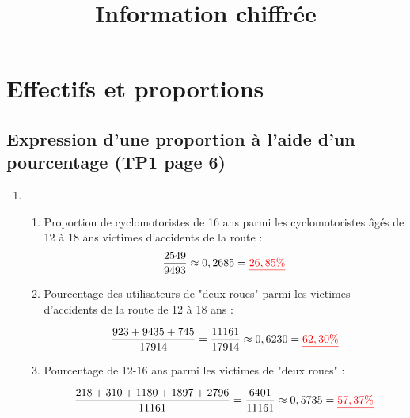 \documentclass[12pt,a4paper]{article}
\date{}
\title{Information chiffrée }
\begin{document}





\section{Effectifs et proportions}

\subsection{Expression d'une proportion à l'aide d'un pourcentage (TP1 page 6)}

\begin{enumerate}[label=\arabic*.]
	\item 
	\begin{enumerate} [label=\alph*) ]
		\item Proportion de cyclomotoristes de 16 ans parmi les cyclomotoristes âgés de 12 à 18 ans victimes d'accidents de la route :
			\begin{eqnarray*}
				\dfrac{2549}{9493} \approx 0,2685 = \textcolor{red}{\underline{26,85\%}}
			\end{eqnarray*}
			
		\item Pourcentage des utilisateurs de "deux roues" parmi les victimes d'accidents de la route de 12 à 18 ans :
		
			\begin{equation*}
				\dfrac{923 + 9435 + 745}{17914} = \dfrac{11 161}{17914} \approx 0,6230 = \textcolor{red}{\underline{62,30 \%}}
			\end{equation*}
			
		\item Pourcentage de 12-16 ans parmi les victimes de "deux roues" :
		
			\begin{equation*}
				\dfrac{218 + 310 + 1180 + 1897 + 2796}{11161} = \dfrac{6401}{11161} \approx 0,5735 = \textcolor{red}{\underline{57,37 \%}}
			\end{equation*}
	\end{enumerate}
\end{enumerate}
\end{document}
